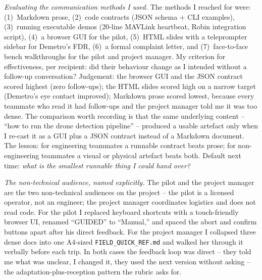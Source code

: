 \textit{Evaluating the communication methods I used.}  The methods I reached for were: (1)~Markdown prose, (2)~code contracts (JSON schema + CLI examples), (3)~running executable demos (20-line MAVLink heartbeat, Robin integration script), (4)~a browser GUI for the pilot, (5)~HTML slides with a teleprompter sidebar for Demetro's FDR, (6)~a formal complaint letter, and (7)~face-to-face bench walkthroughs for the pilot and project manager. My criterion for effectiveness, per recipient: did their behaviour change as I intended without a follow-up conversation? Judgement: the browser GUI and the JSON contract scored highest (zero follow-ups); the HTML slides scored high on a narrow target (Demetro's eye contact improved); Markdown prose scored lowest, because every teammate who read it had follow-ups and the project manager told me it was too dense. The comparison worth recording is that the same underlying content -- ``how to run the drone detection pipeline'' -- produced a usable artefact only when I re-cast it as a GUI plus a JSON contract instead of a Markdown document. The lesson: for engineering teammates a runnable contract beats prose; for non-engineering teammates a visual or physical artefact beats both. Default next time: \textit{what is the smallest runnable thing I could hand over?}

\textit{The non-technical audience, named explicitly.} The pilot and the project manager are the two non-technical audiences on the project -- the pilot is a licensed operator, not an engineer; the project manager coordinates logistics and does not read code. For the pilot I replaced keyboard shortcuts with a touch-friendly browser UI, renamed ``GUIDED'' to ``Manual,'' and spaced the abort and confirm buttons apart after his direct feedback. For the project manager I collapsed three dense docs into one A4-sized \texttt{FIELD\_QUICK\_REF.md} and walked her through it verbally before each trip. In both cases the feedback loop was direct -- they told me what was unclear, I changed it, they used the next version without asking -- the adaptation-plus-reception pattern the rubric asks for.

